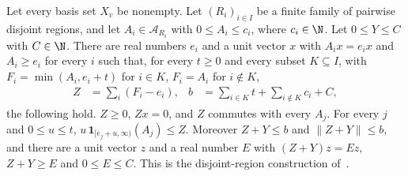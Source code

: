 \begin{theorem}
    \label{thm:disjoint_regional_clipping}
    \leanok
    Let every basis set $X_v$ be nonempty. Let $(R_i)_{i\in I}$ be a finite family of pairwise disjoint regions, and
    let $A_i\in\mathcal A_{R_i}$ with $0\le A_i\le c_i$, where $c_i\in\N$. Let
    $0\le Y\le C$ with $C\in\N$. There are real numbers $e_i$ and a unit vector
    $x$ with $A_ix=e_ix$ and $A_i\ge e_i$ for every $i$ such that, for every
    $t\ge0$ and every subset $K\subseteq I$, with $F_i=\min(A_i,e_i+t)$ for
    $i\in K$, $F_i=A_i$ for $i\notin K$,
    \begin{align}
        Z & =\sum_i(F_i-e_i), & b & =\sum_{i\in K}t+\sum_{i\notin K}c_i+C,
    \end{align}
    the following hold. $Z\ge0$, $Zx=0$, and $Z$ commutes with every $A_j$.
    For every $j$ and $0\le u\le t$, $u\,\mathbf1_{[e_j+u,\infty)}(A_j)\le Z$.
    Moreover $Z+Y\le b$ and $\lVert Z+Y\rVert\le b$, and there are a unit
    vector $z$ and a real number $E$ with $(Z+Y)z=Ez$, $Z+Y\ge E$ and
    $0\le E\le C$. This is the disjoint-region construction
    of~\cite[lines 873--886, 979--1005 and 1010--1024]{Arad2016RigorousRG}.
\end{theorem}
